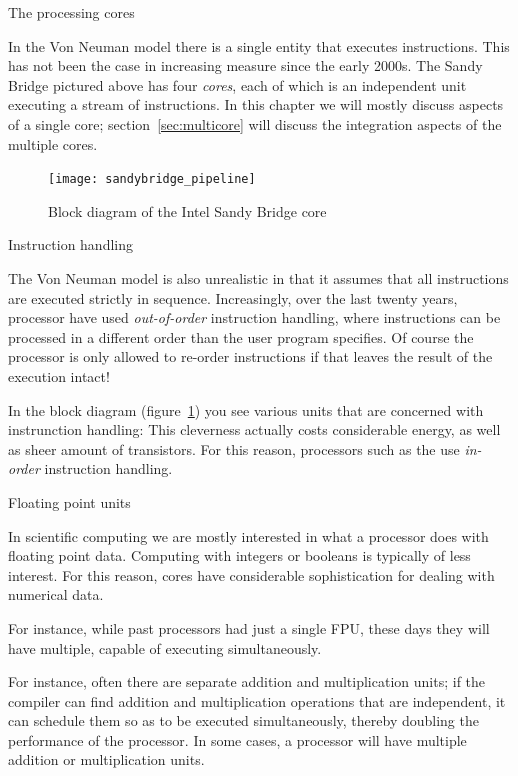  {The processing cores}

In the Von Neuman model there is a single entity that executes instructions.
This has not been the case in increasing measure since the early 2000s.
The Sandy Bridge pictured above has four \emph{cores}, each of which
is an independent unit executing a stream of instructions.
In this chapter we will mostly discuss aspects of a single core; 
section~\ref{sec:multicore} will discuss the integration aspects 
of the multiple cores.

\begin{figure}[ht]
  \texttt{[image: sandybridge\_pipeline]}
  \caption{Block diagram of the Intel Sandy Bridge core}
  \label{fig:sandycore}
\end{figure}

 {Instruction handling}

 The Von
Neuman model is also unrealistic in that it assumes that all
instructions are executed strictly in sequence.  Increasingly, over
the last twenty years, processor have used
\emph{out-of-order}
instruction handling, where instructions can be processed
in a different order than the user program specifies. 
Of course the processor is only allowed to re-order instructions
if that leaves the result of the execution intact!

In the block diagram (figure~\ref{fig:sandycore}) you see various
units that are concerned with instrunction handling: This cleverness
actually costs considerable energy, as well as sheer amount of
transistors. For this reason, processors such as the
 use
\emph{in-order} instruction
handling.

 {Floating point units}

In scientific computing we are mostly interested in what a processor
does with floating point data. Computing with integers or booleans 
is typically of less interest. For this reason, cores have
considerable sophistication for dealing with numerical data.

For instance, while past processors had just a single \acf{FPU},
these days they will have multiple, capable of executing
simultaneously.

For instance, often there are separate addition and
multiplication units; if the compiler can find addition and
multiplication operations that are independent, it can schedule them
so as to be executed simultaneously, thereby doubling the performance
of the processor. In some cases, a processor will have multiple
addition or multiplication units.

